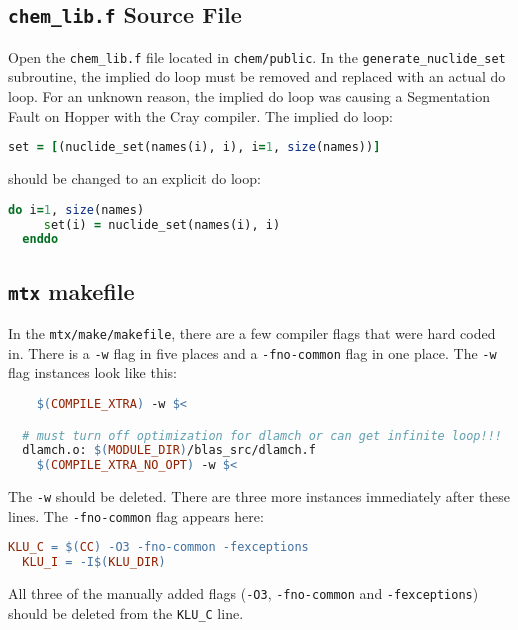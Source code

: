 \subsection{{\tt chem\_lib.f} Source File}

Open the {\tt chem\_lib.f} file located in {\tt chem/public}. In the 
{\tt generate\_nuclide\_set} subroutine, the implied do loop must be removed 
and replaced with an actual do loop. For an unknown reason, the implied do 
loop was causing a Segmentation Fault on Hopper with the Cray compiler. The 
implied do loop:
\begin{lstlisting}[language=fortran,mathescape=false]
  set = [(nuclide_set(names(i), i), i=1, size(names))]
\end{lstlisting}
should be changed to an explicit do loop:
\begin{lstlisting}[language=fortran,mathescape=false]
  do i=1, size(names)
     set(i) = nuclide_set(names(i), i)
  enddo
\end{lstlisting}


\subsection{{\tt mtx} makefile}

In the {\tt mtx/make/makefile}, there are a few compiler flags that were hard 
coded in. There is a {\tt -w} flag in five places and a {\tt -fno-common} 
flag in one place. The {\tt -w} flag instances look like this:
\begin{lstlisting}[language=make,mathescape=false]
  %.o: $(MODULE_DIR)/lapack_src/%.f
  	$(COMPILE_XTRA) -w $<

  # must turn off optimization for dlamch or can get infinite loop!!!
  dlamch.o: $(MODULE_DIR)/blas_src/dlamch.f
  	$(COMPILE_XTRA_NO_OPT) -w $<
\end{lstlisting}
The {\tt -w} should be deleted. There are three more instances immediately 
after these lines. The {\tt -fno-common} flag appears here:
\begin{lstlisting}[language=make,mathescape=false]
  KLU_C = $(CC) -O3 -fno-common -fexceptions
  KLU_I = -I$(KLU_DIR)
\end{lstlisting}
All three of the manually added flags ({\tt -O3}, {\tt -fno-common} and 
{\tt -fexceptions}) should be deleted from the {\tt KLU\_C} line.

